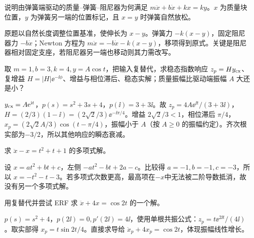 \begin{exercise}\label{cw:rec10-2}
说明由弹簧端驱动的质量--弹簧--阻尼器为何满足 $m\ddot x+b\dot x+kx=ky$。$x$ 为质量块位置，$y$ 为弹簧另一端的位置标记，且 $x=y$ 时弹簧自然放松。
\end{exercise}
\begin{solution}
原题以自然长度调整位置基准，使伸长为 $x-y$。弹簧力 $-k(x-y)$，固定阻尼器力 $-b\dot x$；Newton 方程为 $m\ddot x=-b\dot x-k(x-y)$，移项得到原式。关键是阻尼器相对固定支座，若阻尼器另一端也移动则其力需改写。
\par{}
\end{solution}

\begin{exercise}\label{cw:rec10-3}
取 $m=1,b=3,k=4,y=A\cos t$，把输入复替代，求稳态指数响应 $z_p=Hy_{\rm cx}$、复增益 $H=|H|\ee^{-\ii\phi}$、增益与相位滞后、稳态实解；质量振幅比驱动端振幅 $A$ 大还是小？
\end{exercise}
\begin{solution}
$y_{\rm cx}=A\mathrm e^{\mathrm i t}$，$p(s)=s^2+3s+4$，$p(\ii)=3+3\ii$。故 $z_p=4A\ee^{\ii t}/(3+3\ii)$，$H=(2/3)(1-\ii)=(2\sqrt2/3)\ee^{-\ii\pi/4}$。增益 $2\sqrt2/3<1$，相位滞后 $\pi/4$，$x_p=(2\sqrt2A/3)\cos(t-\pi/4)$，振幅小于 $A$（按 $A\ge0$ 的振幅约定）。齐次根实部为$-3/2$，所以其他响应的瞬态衰减。
\par{}
\end{solution}

\begin{exercise}\label{cw:rec10-4}
求 $\ddot x-x=t^2+t+1$ 的多项式解。
\end{exercise}
\begin{solution}
设 $x=at^2+bt+c$，左侧 $-at^2-bt+2a-c$。比较得 $a=-1,b=-1,c=-3$，所以 $x=-t^2-t-3$。若多项式次数更高，最高项在$-x$中无法被二阶导数抵消，故没有另一个多项式解。
\par{}
\end{solution}

\begin{exercise}\label{cw:rec10-5}
用复替代并尝试 ERF 求 $\ddot x+4x=\cos2t$ 的一个解。
\end{exercise}
\begin{solution}
$p(s)=s^2+4$，$p(2\ii)=0,p'(2\ii)=4\ii$，使用单根共振公式：$z_p=t\ee^{2\ii t}/(4\ii)$。取实部得 $x_p=t\sin2t/4$。直接求导给 $\ddot x_p+4x_p=\cos2t$，体现振幅线性增长。
\par{}
\end{solution}

